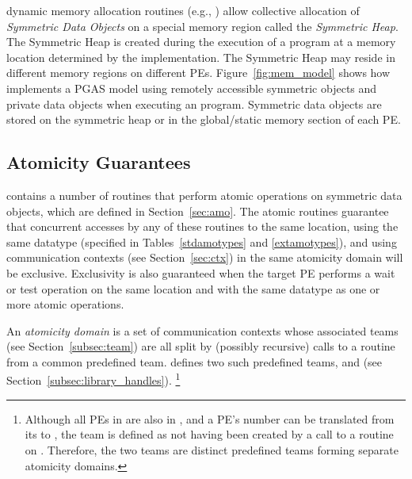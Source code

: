 \openshmem dynamic memory allocation routines (e.g.,
) allow collective allocation of \emph{Symmetric Data
Objects} on a special memory region called the \emph{Symmetric Heap}. The
Symmetric Heap is created during the execution of a program at a memory location
determined by the implementation. The Symmetric Heap may reside in different
memory regions on different \acp{PE}. Figure~\ref{fig:mem_model} shows how
\openshmem implements a \ac{PGAS} model using remotely accessible symmetric
objects and private data objects when executing an \openshmem program.
Symmetric data objects are stored on the symmetric heap or in the global/static
memory section of each \ac{PE}.

\subsection{Atomicity Guarantees}\label{subsec:amo_guarantees}

\openshmem contains a number of routines that perform atomic operations on
symmetric data objects, which are defined in Section~\ref{sec:amo}.
The atomic routines
guarantee that concurrent accesses by any of these routines to the same
location, using the same datatype (specified in Tables~\ref{stdamotypes} and
\ref{extamotypes}), and using communication contexts (see Section~\ref{sec:ctx})
in the same atomicity domain will be exclusive.
Exclusivity is also guaranteed when the target \ac{PE} performs a wait or test
operation on the same location and with the same datatype as one or more atomic
operations.

An \openshmem \emph{atomicity domain} is a set of communication
contexts whose associated teams (see Section~\ref{subsec:team}) are
all split by (possibly recursive) calls to a
 routine from a common predefined team.
\openshmem defines two such predefined teams, 
and  (see Section~\ref{subsec:library_handles}).%
\footnote{
  Although all \acp{PE} in  are also
  in , and a \ac{PE}'s number can be
  translated from its  to
  , the
   team is defined as not having
  been created by a call to a  routine on
  .
  Therefore, the two teams are distinct predefined teams forming
  separate atomicity domains.
}

